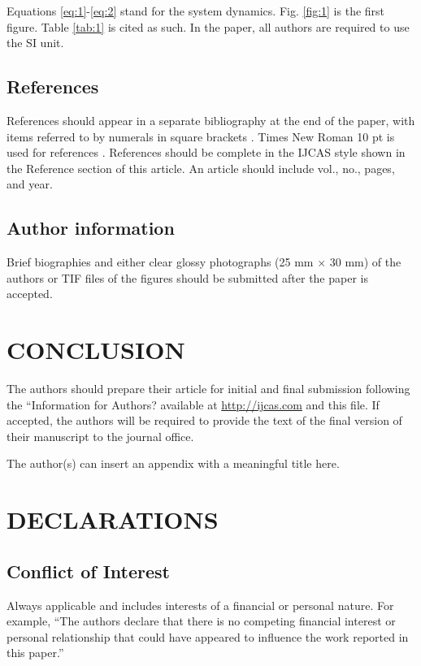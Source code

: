 \documentclass{IJCAS}
\begin{document}
Equations \eqref{eq:1}-\eqref{eq:2} stand for the system dynamics. Fig. \ref{fig:1} is the first figure. Table \ref{tab:1} is cited as such. In the paper, all authors are required to use the SI unit.


\subsection{References}

References should appear in a separate bibliography at the end of the paper, with items referred to by numerals in square brackets \cite{1,3,4,5}. Times New Roman 10 pt is used for references \cite{2}. References should be complete in the IJCAS style shown in the Reference section of this article. An article should include vol., no., pages, and year.



\subsection{Author information}

Brief biographies and either clear glossy photographs (25 mm $\times$ 30 mm) of the authors or TIF files of the figures should be submitted after the paper is accepted.



\section{CONCLUSION}

The authors should prepare their article for initial and final submission following the ``Information for Authors? available at \href{http://ijcas.com}{http://ijcas.com} and this file. If accepted, the authors will be required to provide the text of the final version of their manuscript to the journal office. 



\appendix

The author(s) can insert an appendix with a meaningful title here.



\section*{DECLARATIONS}

\subsection*{Conflict of Interest}
Always applicable and includes interests of a financial or personal nature. For example, ``The authors declare that there is no competing financial interest or personal relationship that could have appeared to influence the work reported in this paper.''
\end{document}
